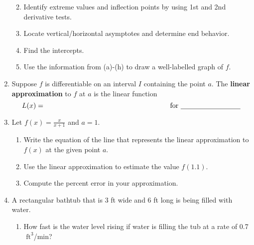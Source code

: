 \documentclass[11pt,letterpaper]{article}
\begin{document}
\begin{enumerate}
\begin{enumerate}
\vspace{20pc}
\item Identify extreme values and inflection points by using 1st and 2nd derivative tests.

\vspace{5pc}
\item Locate vertical/horizontal asymptotes and determine end behavior.

\newpage
\vspace{5pc}
\item Find the intercepts.

\vspace{10pc}
\item Use the information from (a)-(h) to draw a well-labelled graph of $f$.

\end{enumerate}

\newpage
\item Suppose $f$ is differentiable on an interval $I$ containing the point $a$.  The {\bf linear approximation} to $f$ at $a$ is the linear function
\vspace{2pc}
\[L(x)=\hspace{15pc}\text{for \underline{\hspace{20ex}}}\]

\vspace{5pc}
\item Let $f(x)=\frac{x}{x+1}$ and $a=1$.

\begin{enumerate}
\item Write the equation of the line that represents the linear approximation to $f(x)$ at the given point $a$.

\vspace{10pc}
\item Use the linear approximation to estimate the value $f(1.1)$.

\vspace{10pc}
\item Compute the percent error in your approximation.

\end{enumerate}

\newpage
\item A rectangular bathtub that is 3 ft wide and 6 ft long is being filled with water.

\begin{enumerate}
\item How fast is the water level rising if water is filling the tub at a rate of 0.7$\text{ ft}^3$/min?


\end{enumerate}
\end{enumerate}
\end{document}
